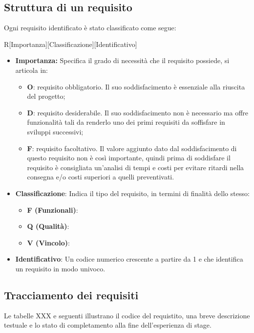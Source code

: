 \subsection{Struttura di un requisito}
Ogni requisito identificato è stato classificato come segue:
\begin{center}
	R[Importanza][Classificazione][Identificativo]
\end{center}
\begin{itemize}
	\item \textbf{Importanza:} Specifica il grado di necessità che il requisito possiede, si articola in:
	\begin{itemize}
		\item \textbf{O}: requisito obbligatorio. Il suo soddisfacimento è essenziale alla riuscita del progetto;
		\item \textbf{D}: requisito desiderabile. Il suo soddisfacimento non è necessario ma offre funzionalità tali da renderlo uno dei primi requisiti da soffisfare in sviluppi successivi;
		\item \textbf{F}: requisito facoltativo. Il valore aggiunto dato dal soddisfacimento di questo requisito non è così importante, quindi prima di soddisfare il requisito è consigliata un’analisi di tempi e costi per evitare ritardi nella consegna e/o costi superiori a quelli preventivati.
	\end{itemize}
	\item \textbf{Classificazione}: Indica il tipo del requisito, in termini di finalità dello stesso:
	\begin{itemize}
		\item \textbf{F (Funzionali)}: 
		\item \textbf{Q (Qualità)}: 
		\item \textbf{V (Vincolo)}:
	\end{itemize} 
	\item \textbf{Identificativo}: Un codice numerico crescente a partire da 1 e che identifica un requisito in modo univoco. 
\end{itemize}

\subsection{Tracciamento dei requisiti}
Le tabelle XXX e seguenti illustrano il codice del requistito, una breve descrizione testuale e lo stato di completamento alla fine dell'esperienza di stage. \\


